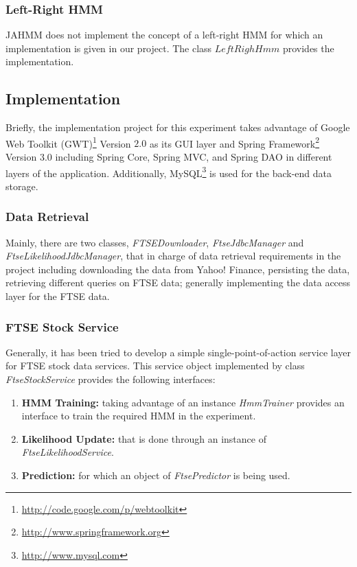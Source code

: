 \documentclass{acm_proc_article-sp}
\begin{document}
\subsubsection{Left-Right HMM}
JAHMM does not implement the concept of a left-right HMM for which an implementation is given in our project. The class
$LeftRighHmm$ provides the implementation.

\subsection{Implementation}
Briefly, the implementation project for this experiment takes advantage of Google Web Toolkit
(GWT)\footnote{\url{http://code.google.com/p/webtoolkit}} Version $2.0$ as its GUI layer and Spring
Framework\footnote{\url{http://www.springframework.org}} Version $3.0$ including Spring Core, Spring MVC, and Spring DAO
in different layers of the application. Additionally, MySQL\footnote{\url{http://www.mysql.com}} is used for the
back-end data storage.

\subsubsection{Data Retrieval}
Mainly, there are two classes, \textit{FTSEDownloader}, \textit{FtseJdbcManager} and \textit{FtseLikelihoodJdbcManager}, that
in charge of data retrieval requirements in the project including downloading the data from Yahoo! Finance, persisting the data,
retrieving different queries on FTSE data; generally implementing the data access layer for the FTSE data.

\subsubsection{FTSE Stock Service}
Generally, it has been tried to develop a simple single-point-of-action service layer for FTSE stock data services.
This service object implemented by class \textit{FtseStockService} provides the following interfaces:
\begin{enumerate}
  \item \textbf{HMM Training:} taking advantage of an instance \textit{HmmTrainer} provides an interface to train the required
  HMM in the experiment.
  \item \textbf{Likelihood Update:} that is done through an instance of \textit{FtseLikelihoodService}.
  \item \textbf{Prediction:} for which an object of \textit{FtsePredictor} is being used.
\end{enumerate}
\end{document}
